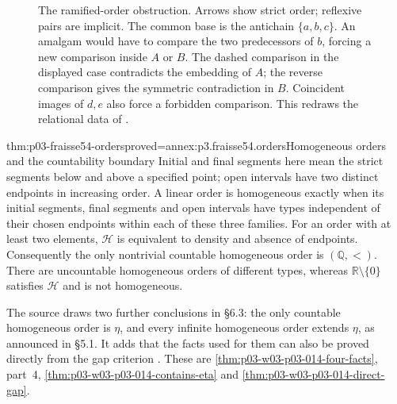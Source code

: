 \begin{figure}[htbp]
\centering
{}
\caption{The ramified-order obstruction. Arrows show strict order;
reflexive pairs are implicit. The common base is the antichain
\(\{a,b,c\}\). An amalgam would have to compare the two predecessors of
\(b\), forcing a new comparison inside \(A\) or \(B\).
The dashed comparison in the displayed case contradicts the embedding of
\(A\); the reverse comparison gives the symmetric contradiction in \(B\).
Coincident images of \(d,e\) also force a forbidden comparison.
This redraws the relational data of \cite[Fig.~2, p.~387]{Fraisse1954}.}
\label{fig:p03-fraisse54-ramified}
\end{figure}

\begin{hbtheorem}{thm:p03-fraisse54-orders}{proved=annex:p3.fraisse54.orders}{Homogeneous orders and the countability boundary}
Initial and final segments here mean the strict segments below and above
a specified point; open intervals have two distinct endpoints in increasing
order.
A linear order is homogeneous exactly when its initial segments, final
segments and open intervals have types independent of their
chosen endpoints within each of these three families. For an order with
at least two elements, \(\mathcal H\) is equivalent to density and absence
of endpoints. Consequently the only nontrivial countable homogeneous order
is \((\mathbb Q,<)\).
There are uncountable homogeneous orders of different types, whereas
\(\mathbb R\setminus\{0\}\) satisfies \(\mathcal H\) and is not homogeneous.
\end{hbtheorem}

The source draws two further conclusions in \S6.3: the only countable
homogeneous order is \(\eta\), and every infinite homogeneous order extends
\(\eta\), as announced in \S5.1. It adds that the facts used for them can
also be proved directly from the gap criterion
\cite[\S5.1, p.~377; \S6.3, p.~380]{Fraisse1954}. These are
\cref{thm:p03-w03-p03-014-four-facts}, part~4,
\cref{thm:p03-w03-p03-014-contains-eta} and
\cref{thm:p03-w03-p03-014-direct-gap}.

